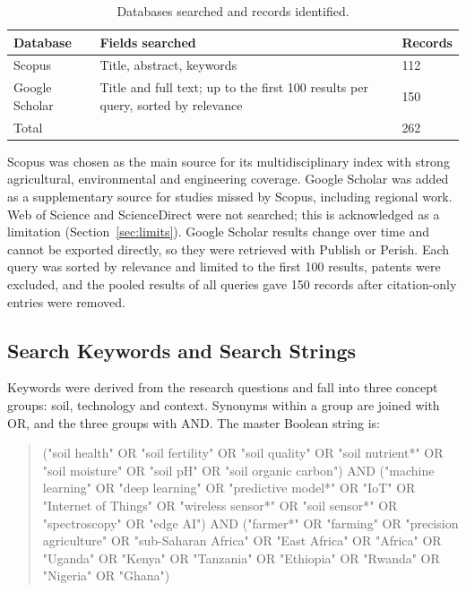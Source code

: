 \documentclass[conference]{IEEEtran}
\begin{document}
\begin{table}[t]
\caption{Databases searched and records identified.}
\label{tab:databases}
\centering
\footnotesize
\begin{tabular}{p{1.05cm}p{4.4cm}l}
\toprule
Database & Fields searched & Records\\
\midrule
Scopus & Title, abstract, keywords & 112\\
Google Scholar & Title and full text; up to the first 100 results per query, sorted by relevance & 150\\
\midrule
Total & & 262\\
\bottomrule
\end{tabular}
\end{table}

Scopus was chosen as the main source for its multidisciplinary index with strong
agricultural, environmental and engineering coverage. Google Scholar was added as
a supplementary source for studies missed by Scopus, including regional work. Web
of Science and ScienceDirect were not searched; this is acknowledged as a
limitation (Section~\ref{sec:limits}). Google Scholar results change over time and
cannot be exported directly, so they were retrieved with Publish or Perish. Each
query was sorted by relevance and limited to the first 100 results, patents were
excluded, and the pooled results of all queries gave 150 records after
citation-only entries were removed.

\subsection{Search Keywords and Search Strings}
Keywords were derived from the research questions and fall into three concept
groups: soil, technology and context. Synonyms within a group are joined with OR,
and the three groups with AND. The master Boolean string is:

\begin{quote}
\footnotesize\ttfamily\raggedright
("soil health" OR "soil fertility" OR "soil quality" OR "soil nutrient*" OR
"soil moisture" OR "soil pH" OR "soil organic carbon") AND ("machine learning"
OR "deep learning" OR "predictive model*" OR "IoT" OR "Internet of Things" OR
"wireless sensor*" OR "soil sensor*" OR "spectroscopy" OR "edge AI") AND
("farmer*" OR "farming" OR "precision agriculture" OR "sub-Saharan Africa" OR
"East Africa" OR "Africa" OR "Uganda" OR "Kenya" OR "Tanzania" OR "Ethiopia" OR
"Rwanda" OR "Nigeria" OR "Ghana")
\end{quote}
\end{document}
